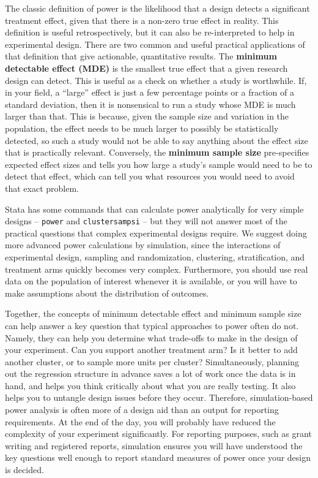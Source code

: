 The classic definition of power
is the likelihood that a design detects a significant treatment effect,
given that there is a non-zero true effect in reality.
This definition is useful retrospectively,
but it can also be re-interpreted to help in experimental design.
There are two common and useful practical applications
of that definition that give actionable, quantitative results.
The \textbf{minimum detectable effect (MDE)}
is the smallest true effect that a given research design can detect.
This is useful as a check on whether a study is worthwhile.
If, in your field, a ``large'' effect is just a few percentage points
or a fraction of a standard deviation,
then it is nonsensical to run a study whose MDE is much larger than that.
This is because, given the sample size and variation in the population,
the effect needs to be much larger to possibly be statistically detected,
so such a study would not be able to say anything about the effect size that is practically relevant.
Conversely, the \textbf{minimum sample size} pre-specifies expected effect sizes
and tells you how large a study's sample would need to be to detect that effect,
which can tell you what resources you would need to avoid that exact problem.

Stata has some commands that can calculate power analytically for
very simple designs -- \texttt{power} and \texttt{clustersampsi} --
but they will not answer most of the practical questions
that complex experimental designs require.
We suggest doing more advanced power calculations by simulation,
since the interactions of experimental design,
sampling and randomization,
clustering, stratification, and treatment arms
quickly becomes very complex.
Furthermore, you should use real data on the population of interest whenever it is available,
or you will have to make assumptions about the distribution of outcomes.

Together, the concepts of minimum detectable effect
and minimum sample size can help answer a key question
that typical approaches to power often do not.
Namely, they can help you determine what trade-offs to make
in the design of your experiment.
Can you support another treatment arm?
Is it better to add another cluster,
or to sample more units per cluster?
Simultaneously, planning out the regression structure
in advance saves a lot of work once the data is in hand,
and helps you think critically about what you are really testing.
It also helps you to untangle design issues before they occur.
Therefore, simulation-based power analysis is often more of a design aid
than an output for reporting requirements.
At the end of the day, you will probably have reduced
the complexity of your experiment significantly.
For reporting purposes, such as grant writing and registered reports,
simulation ensures you will have understood the key questions well enough
to report standard measures of power once your design is decided.

